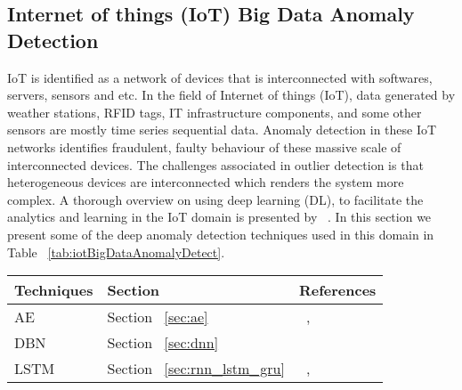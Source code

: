 \subsection{Internet of things (IoT) Big Data Anomaly Detection}

IoT is identified as a network of  devices that is interconnected with softwares, servers, sensors and etc. In the field of Internet of things (IoT), data generated by weather stations, RFID tags, IT infrastructure
components, and some other sensors are mostly time series sequential data. Anomaly detection in these IoT networks identifies fraudulent, faulty behaviour of these massive scale of interconnected devices. The challenges associated  in outlier detection is that heterogeneous devices are interconnected which renders the system more complex. A thorough overview on using  deep learning (DL), to facilitate the analytics and learning in the IoT domain is presented by ~\cite{mohammadi2018deep}. In this section we present some of the deep anomaly detection techniques used in this domain in Table ~\ref{tab:iotBigDataAnomalyDetect}.

\begin{table*}
\begin{center}
\caption{Examples of Deep learning anomaly detection Techniques Used in Internet of things (IoT) Big Data Anomaly Detection.
        \\ AE: Autoencoders, LSTM : Long Short Term Memory Networks
        \\ DBN : Deep Belief Networks.}
  \label{tab:iotBigDataAnomalyDetect}
    \begin{tabular}{ | l | p{2cm} | p{6cm} |}
    \hline
     \textbf{Techniques}  & \textbf{Section} & \textbf{References} \\ \hline
     AE & Section ~\ref{sec:ae} & ~\cite{luo2018distributed},~\cite{mohammadi2018neural} \\\hline
     DBN & Section ~\ref{sec:dnn} & ~\cite{kakanakova2017outlier} \\ \hline
     LSTM & Section ~\ref{sec:rnn_lstm_gru} & ~\cite{zhang2018lstm},~\cite{mudassar2018unsupervised}\\ \hline
    \end{tabular}
\end{center}
\end{table*}





